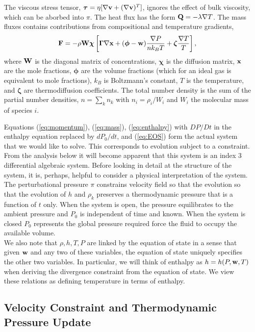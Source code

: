 \documentclass[final]{siamltex}
\def\Fb {{\bf F}}
\def\Qb {{\bf Q}}
\def\vb {{\bf v}}
\def\wb {{\bf w}}
\def\Wb {{\bf W}}
\def\xb {{\bf x}}
\def\chib   {\boldsymbol{\chi}}
\def\Gammab {\boldsymbol{\Gamma}}
\def\phib   {\boldsymbol{\phi}}
\def\taub   {\boldsymbol{\tau}}
\def\zetab  {\boldsymbol{\zeta}}
\begin{document}
The viscous stress tensor,
$\taub = \eta[\nabla\vb + (\nabla\vb)^T]$,
ignores the effect of bulk viscosity, which can be aborbed into $\pi$.
The heat flux has the form $\Qb = -\lambda\nabla T$.
The mass fluxes contains contributions from 
compositional and temperature gradients,
\begin{equation}
\Fb = -\rho\Wb\chib\left[\Gammab\nabla\xb + (\phib - \wb)\frac{\nabla P}{n k_B T} + \zetab\frac{\nabla T}{T}\right],
\end{equation}
where $\Wb$ is the diagonal matrix of concentrations,
$\chib$ is the diffusion matrix, $\xb$ are the mole fractions,
$\phib$ are the volume fractions (which for an ideal gas is equivalent to mole fractions),
$k_B$ is Boltzmann's constant,
$T$ is the temperature, and $\zetab$ are thermodiffusion coefficients.  The total
number density is the sum of the partial number densities, $n=\sum_kn_k$ with
$n_i=\rho_i/W_i$ and $W_i$ the molecular mass of species $i$.

Equations (\ref{eq:momentum}), (\ref{eq:mass}), (\ref{eq:enthalpy})
with $DP/Dt$ in the enthalpy equation replaced by $dP_0/dt$, and (\ref{eq:EOS})
form the actual system that we would like to solve.
This corresponds to evolution subject to a constraint.  From the analysis below it 
will become apparent that this system is an index 3 differential algebraic system.
Before looking in detail at the structure of the system, it is, perhaps, helpful to 
consider a physical interpretation of the
system.  The perturbational pressure $\pi$ constrains velocity field so that
the evolution so that the evolution of $h$ and $\rho_k$
preserves a thermodynamic pressure that is a function of $t$ only.
When the system is open, the pressure
equilibrates to the ambient pressure and $P_0$ is independent of time and known.
When the system is closed
$P_0$ represents the global pressure
required force the fluid to occupy the available volume.\\

We also note that $\rho, h, T, P$ are linked by the equation of state in a sense that given
$\wb$ and any two of these variables, the equation of state uniquely specifies the other
two variables.  In particular, we will think of enthalpy as $h = h(P,\wb,T)$ when deriving
the divergence constraint from the equation of state.
We view these relations as defining temperature in terms of enthalpy.

\subsection{Velocity Constraint and Thermodynamic Pressure Update}
\end{document}
